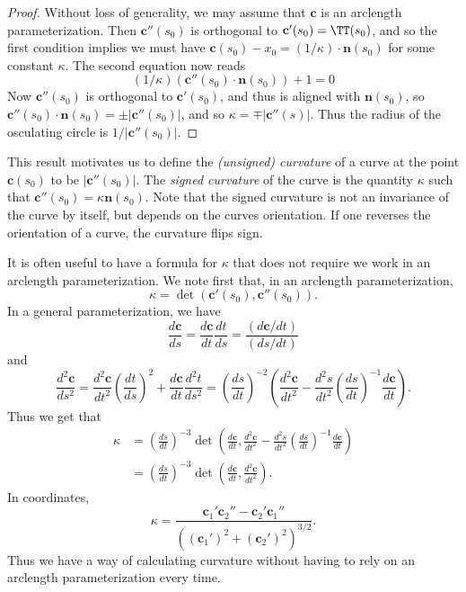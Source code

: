\begin{proof}
    Without loss of generality, we may assume that $\mathbf{c}$ is an arclength parameterization. Then $\mathbf{c}''(s_0)$ is orthogonal to $\mathbf{c}'(s_0) = \TT(s_0)$, and so the first condition implies we must have $\mathbf{c}(s_0) - x_0 = (1/\kappa) \cdot \mathbf{n}(s_0)$ for some constant $\kappa$. The second equation now reads
    \[ (1/\kappa) \left( \mathbf{c}''(s_0) \cdot \mathbf{n}(s_0) \right) + 1 = 0 \]
    Now $\mathbf{c}''(s_0)$ is orthogonal to $\mathbf{c}'(s_0)$, and thus is aligned with $\mathbf{n}(s_0)$, so $\mathbf{c}''(s_0) \cdot \mathbf{n}(s_0) = \pm |\mathbf{c}''(s_0)|$, and so $\kappa = \mp |\mathbf{c}''(s)|$. Thus the radius of the osculating circle is $1/|\mathbf{c}''(s_0)|$.
\end{proof}

This result motivates us to define the \emph{(unsigned) curvature} of a curve at the point $\mathbf{c}(s_0)$ to be $|\mathbf{c}''(s_0)|$. The \emph{signed curvature} of the curve is the quantity $\kappa$ such that $\mathbf{c}''(s_0) = \kappa \mathbf{n}(s_0)$. Note that the signed curvature is not an invariance of the curve by itself, but depends on the curves orientation. If one reverses the orientation of a curve, the curvature flips sign.

It is often useful to have a formula for $\kappa$ that does not require we work in an arclength parameterization. We note first that, in an arclength parameterization,
%
\[ \kappa = \det(\mathbf{c}'(s_0), \mathbf{c}''(s_0)). \]
%
In a general parameterization, we have
%
\[ \frac{d\mathbf{c}}{ds} = \frac{d\mathbf{c}}{dt} \frac{dt}{ds} = \frac{(d\mathbf{c}/dt)}{(ds/dt)} \]
%
and
%
\[ \frac{d^2\mathbf{c}}{ds^2} = \frac{d^2\mathbf{c}}{dt^2} \left( \frac{dt}{ds} \right)^2 + \frac{d\mathbf{c}}{dt} \frac{d^2t}{ds^2} = \left( \frac{ds}{dt} \right)^{-2} \left( \frac{d^2 \mathbf{c}}{dt^2} - \frac{d^2 s}{dt^2} \left( \frac{ds}{dt} \right)^{-1} \frac{d \mathbf{c}}{dt} \right). \]
%
Thus we get that
%
\begin{align*}
    \kappa &= \left( \frac{ds}{dt} \right)^{-3} \det \left( \frac{d\mathbf{c}}{dt}, \frac{d^2 \mathbf{c}}{dt^2} - \frac{d^2 s}{dt^2} \left( \frac{ds}{dt} \right)^{-1}  \frac{d \mathbf{c}}{dt} \right)\\
    &= \left( \frac{ds}{dt} \right)^{-3} \det \left( \frac{d\mathbf{c}}{dt}, \frac{d^2 \mathbf{c}}{dt^2} \right).
\end{align*}
%
In coordinates,
%
\[ \kappa = \frac{\mathbf{c}_1' \mathbf{c}_2'' - \mathbf{c}_2' \mathbf{c}_1''}{((\mathbf{c}_1')^2 + (\mathbf{c}_2')^2)^{3/2}}. \]
%
Thus we have a way of calculating curvature without having to rely on an arclength parameterization every time.

